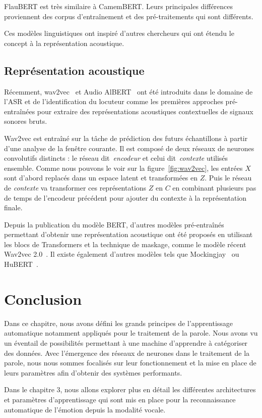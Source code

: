 FlauBERT est très similaire à CamemBERT. Leurs principales différences proviennent des corpus d’entraînement et des pré-traitements qui sont différents. %

Ces modèles linguistiques ont inspiré d'autres chercheurs qui ont étendu le concept à la représentation acoustique.

\subsection{Représentation acoustique}
Récemment, wav2vec~\cite{Schneider2019} et Audio AlBERT~\cite{Chi2020} ont été introduits dans le domaine de l'ASR et de l'identification du locuteur comme les premières approches pré-entraînées pour extraire des représentations acoustiques contextuelles de signaux sonores bruts.



Wav2vec est entraîné sur la tâche de prédiction des futurs échantillons à partir d'une analyse de la fenêtre courante. Il est composé de deux réseaux de neurones convolutifs distincts : le réseau dit~\textit{encodeur} et celui dit~\textit{contexte} utilisés ensemble. Comme nous pouvons le voir sur la figure~\ref{fig:wav2vec}, les entrées $X$ sont d'abord replacés dans un espace latent et transformées en $Z$. Puis le réseau de \textit{contexte} va transformer ces représentations $Z$ en $C$ en combinant plusieurs pas de temps de l'encodeur précédent pour ajouter du contexte à la représentation finale.

Depuis la publication du modèle BERT, d'autres modèles pré-entraînés permettant d'obtenir une représentation acoustique ont été proposés en utilisant les blocs de Transformers et la technique de maskage, comme le modèle récent Wav2vec 2.0~\cite{Baevski2020}.
Il existe également d'autres modèles tels que Mockingjay~\cite{Liu2020} ou HuBERT~\cite{Hsu2021}.

\section{Conclusion}
Dans ce chapitre, nous avons défini les grands principes de l'apprentissage automatique notamment appliqués pour le traitement de la parole. Nous avons vu un éventail de possibilités permettant à une machine d'apprendre à catégoriser des données. Avec l'émergence des réseaux de neurones dans le traitement de la parole, nous nous sommes focalisés sur leur fonctionnement et la mise en place de leurs paramètres afin d'obtenir des systèmes performants.

Dans le chapitre 3, nous allons explorer plus en détail les différentes architectures et paramètres d'apprentissage qui sont mis en place pour la reconnaissance automatique de l'émotion depuis la modalité vocale.
